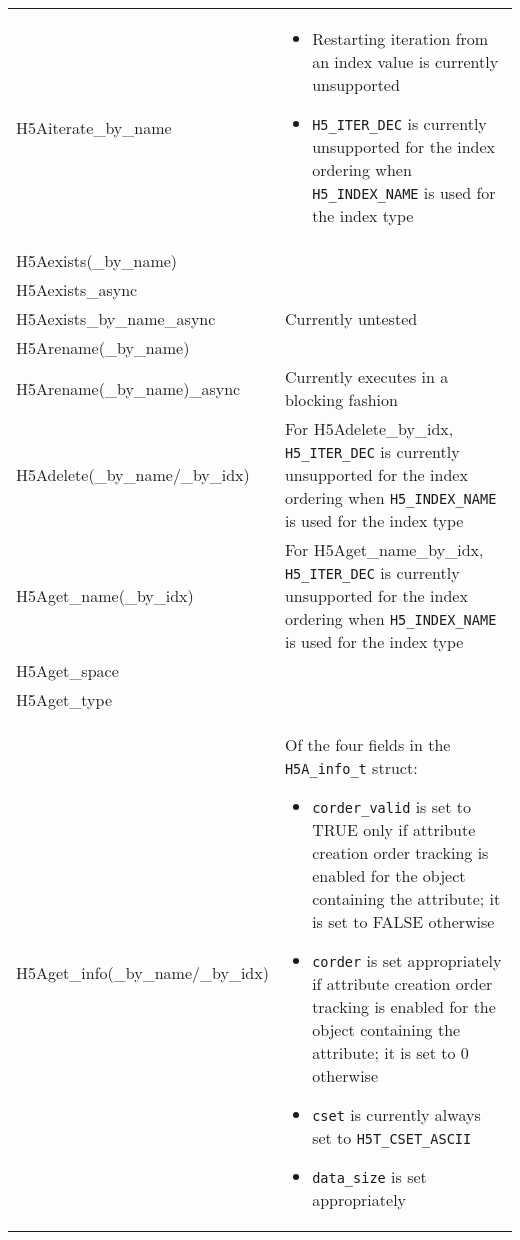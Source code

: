 \documentclass[../users_guide.tex]{subfiles}
\begin{document}
\begin{center}
\begin{tabularx}{\linewidth}{| X | >{\RaggedRight}X |}
\end{tabularx}


\begin{tabularx}{\linewidth}{| X | >{\RaggedRight}X |}
\hline
\rowcolor{lightgray!50}%
\multicolumn{1}{| c |}{\textbf{API call}} & \multicolumn{1}{c |}{\textbf{Notes}} \\ \hline

H5Aiterate\_by\_name & \begin{itemize}
                           \item Restarting iteration from an index value is currently unsupported\footnotemark[1]
                           \item \texttt{H5\_ITER\_DEC} is currently unsupported for the index ordering when \texttt{H5\_INDEX\_NAME} is used for the index type
                       \end{itemize}\\ \hline
H5Aexists(\_by\_name) & \\ \hline
H5Aexists\_async & \\ \hline
H5Aexists\_by\_name\_async & Currently untested\\ \hline
H5Arename(\_by\_name) & \\ \hline
H5Arename(\_by\_name)\_async & Currently executes in a blocking fashion\\ \hline
H5Adelete(\_by\_name/\_by\_idx) & For H5Adelete\_by\_idx, \texttt{H5\_ITER\_DEC} is currently unsupported for the index ordering when \texttt{H5\_INDEX\_NAME} is used for the index type\\ \hline
H5Aget\_name(\_by\_idx) & For H5Aget\_name\_by\_idx, \texttt{H5\_ITER\_DEC} is currently unsupported for the index ordering when \texttt{H5\_INDEX\_NAME} is used for the index type\\ \hline
H5Aget\_space & \\ \hline
H5Aget\_type & \\ \hline
H5Aget\_info(\_by\_name/\_by\_idx) & Of the four fields in the \texttt{H5A\_info\_t} struct:
                                     \begin{itemize}
                                         \item \texttt{corder\_valid} is set to TRUE only if attribute creation order tracking is enabled for the object containing the attribute; it is set to FALSE otherwise
                                         \item \texttt{corder} is set appropriately if attribute creation order tracking is enabled for the object containing the attribute; it is set to 0 otherwise
                                         \item \texttt{cset} is currently always set to \texttt{H5T\_CSET\_ASCII}
                                         \item \texttt{data\_size} is set appropriately
                                     \end{itemize}


\end{tabularx}
\end{center}
\end{document}
